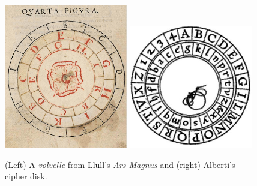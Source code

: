 \begin{figure}
    \centering
    \includegraphics[width=0.48\textwidth]{ch1/images/llull.png}
    \includegraphics[width=0.48\textwidth]{ch1/images/cipher.JPG}
    \caption{(Left) A \textit{volvelle} from  Llull's \textit{Ars Magnus} 
    and (right) Alberti's cipher disk.}
    \label{fig:llull}
\end{figure}

